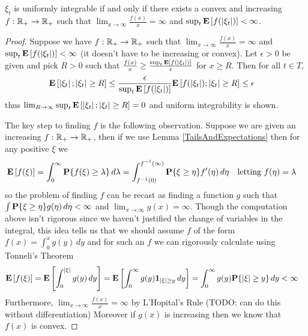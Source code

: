 \begin{lem}$\xi_t$ is uniformly integrable if and only if there exists
  a convex and increasing $f : \mathbb{R}_+ \to \mathbb{R}_+$ such that
  $\lim_{x \to \infty} \frac{f(x)}{x} = \infty$ and $\sup_t
  \textbf{E}\left[f(\left \vert \xi_t \right \vert)\right] < \infty$.
\end{lem}
\begin{proof}
Suppose we have $f : \mathbb{R}_+ \to \mathbb{R}_+$ such that $\lim_{x \to
  \infty} \frac{f(x)}{x} = \infty$ and
$\sup_t  \textbf{E}\left[f(\left \vert \xi_t \right \vert)\right] < \infty$ (it doesn't have to be
increasing or convex).  Let $\epsilon > 0$ be given and pick $R > 0$
such that $\frac{f(x)}{x} \geq \frac{\sup_t \textbf{E}\left[f(\left \vert \xi_t \right \vert)\right]}{\epsilon }$
for $x \geq R$.  Then for all $t \in T$,
\begin{align*}
\textbf{E}\left[\left \vert \xi_t \right \vert; \left \vert \xi_t \right \vert \geq R\right] &\leq
\frac{\epsilon}{\sup_t \textbf{E}\left[f(\left \vert \xi_t \right \vert)\right]}
\textbf{E}\left[f(\left \vert \xi_t \right \vert); \left \vert \xi_t \right \vert \geq R\right] 
\leq \epsilon
\end{align*}
thus $\lim_{R \to \infty} \sup_t  \textbf{E}\left[\left \vert \xi_t \right \vert;
  \left \vert \xi_t \right \vert \geq R\right] = 0$ and uniform integrability is shown.

The key step to finding $f$ is the following observation.  Suppose we
are given an increasing $f : \mathbb{R}_+ \to \mathbb{R}_+$, then if we use
Lemma \ref{TailsAndExpectations} then for any positive $\xi$ we 
\begin{align*}
\textbf{E}\left[f(\xi)\right] &= \int_0^\infty \textbf{P}\{f(\xi) \geq \lambda\} \, d\lambda =
\int_{f^{-1}(0)}^{f^{-1}(\infty)} \textbf{P}\{\xi \geq \eta\} f^\prime(\eta) \, d\eta & &
\text{letting $f(\eta) = \lambda$}
\end{align*}
so the problem of finding $f$ can be recast as finding a function $g$
such that $\int \textbf{P}\{\xi \geq \eta\} g(\eta) \, d\eta < \infty$
and $\lim_{x \to \infty} g(x) = \infty$.  Though the computation above
isn't rigorous since we haven't justified the change of variables in
the integral, this idea tells us that we
should assume $f$ of the form $f(x) = \int_0^x g(y) \, dy$ and for
such an $f$ we can rigorously calculate using Tonneli's Theorem
\begin{align*}
\textbf{E}\left[f(\xi)\right] &= \textbf{E}\left[\int_0^{\left \vert \xi \right \vert} g(y) \, dy\right] =
\textbf{E}\left[\int_0^\infty g(y) \textbf{1}_{\left \vert \xi \right \vert \geq y} \,
  dy\right] = \int_0^\infty g(y) \textbf{P}\{\left \vert \xi \right \vert \geq y\}\,
  dy < \infty
\end{align*}
Furthermore, 
$\lim_{x \to \infty} \frac{f(x)}{x} = \infty$ by L'Hopital's Rule
(TODO: can do this without differentiation)
Moreover if $g(x)$ is increasing then we know that $f(x)$ is convex.


\end{proof}
